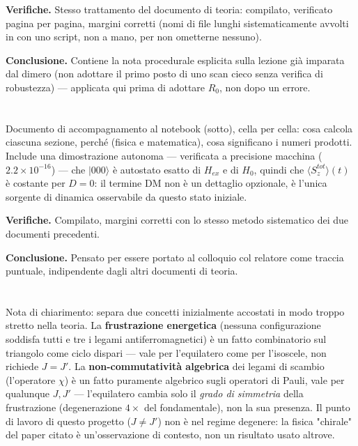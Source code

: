 \documentclass[11pt,a4paper]{article}
\newcommand{\ket}[1]{\lvert #1 \rangle}
\begin{document}
\textbf{Verifiche.} Stesso trattamento del documento di teoria: compilato,
verificato pagina per pagina, margini corretti (nomi di file lunghi sistematicamente
avvolti in \texttt{} con uno script, non a mano, per non ometterne
nessuno).

\textbf{Conclusione.} Contiene la nota procedurale esplicita sulla lezione già
imparata dal dimero (non adottare il primo posto di uno scan cieco senza verifica di
robustezza) — applicata qui prima di adottare $R_0$, non dopo un errore.

\section*{\texttt{}}

Documento di accompagnamento al notebook (sotto), cella per cella: cosa calcola
ciascuna sezione, perché (fisica e matematica), cosa significano i numeri prodotti.
Include una dimostrazione autonoma — verificata a precisione macchina
($2.2\times10^{-16}$) — che $\ket{000}$ è autostato esatto di $H_{ex}$ e di $H_0$,
quindi che $\langle S_z^{tot}\rangle(t)$ è costante per $D=0$: il termine DM non è
un dettaglio opzionale, è l'unica sorgente di dinamica osservabile da questo stato
iniziale.

\textbf{Verifiche.} Compilato, margini corretti con lo stesso metodo sistematico
dei due documenti precedenti.

\textbf{Conclusione.} Pensato per essere portato al colloquio col relatore come
traccia puntuale, indipendente dagli altri documenti di teoria.

\section*{\texttt{}}

Nota di chiarimento: separa due concetti inizialmente accostati in modo troppo
stretto nella teoria. La \textbf{frustrazione energetica} (nessuna configurazione
soddisfa tutti e tre i legami antiferromagnetici) è un fatto combinatorio sul
triangolo come ciclo dispari — vale per l'equilatero come per l'isoscele, non
richiede $J=J'$. La \textbf{non-commutatività algebrica} dei legami di scambio
(l'operatore $\chi$) è un fatto puramente algebrico sugli operatori di Pauli, vale
per qualunque $J,J'$ — l'equilatero cambia solo il \emph{grado di simmetria} della
frustrazione (degenerazione $4\times$ del fondamentale), non la sua presenza. Il
punto di lavoro di questo progetto ($J\neq J'$) non è nel regime degenere: la
fisica "chirale" del paper citato è un'osservazione di contesto, non un risultato
usato altrove.
\end{document}
